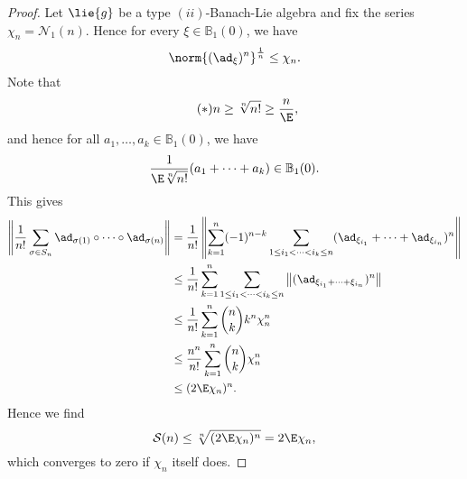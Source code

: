 \documentclass[
11pt,                          %
english                        %
]{article}
\begin{document}
\begin{proof}
	Let $\lie{g}$ be a type $(ii)$-Banach-Lie algebra and fix the series
	$\chi_n = \mathcal{N}_1(n)$. Hence for every $\xi \in \mathbb{B}_1(0)$, we have
	\begin{equation*}
		\norm{(\ad_\xi)^n}^{\frac{1}{n}}
		\leq
		\chi_n.
	\end{equation*}
	Note that 
	\begin{equation*}
		\tag{$*$}
		n \geq \sqrt[n]{n!} \geq \frac{n}{\E},
	\end{equation*}
	and hence for all $a_1, \ldots, a_k \in \mathbb{B}_1(0)$, we have
	\begin{equation*}
		\frac{1}{\E \sqrt[n]{n!}} (a_1 + \cdots + a_k)
		\in \mathbb{B}_1(0).
	\end{equation*}
	This gives
	\begin{align*}
		\left\Vert
			\frac{1}{n!}
			\sum\limits_{\sigma \in S_n}
			\ad_{\sigma(1)}
			\circ \cdots \circ
			\ad_{\sigma(n)}
		\right\Vert
		&=
		\frac{1}{n!}
		\left\Vert
			\sum\limits_{k = 1}^n
			(-1)^{n-k}
			\sum\limits_{1 \leq i_1 < \cdots < i_k \leq n}
			(\ad_{\xi_{i_1}} + \cdots + \ad_{\xi_{i_n}})^n
		\right\Vert
		\\
		& \leq
		\frac{1}{n!}
		\sum\limits_{k = 1}^n
		\sum\limits_{1 \leq i_1 < \cdots < i_k \leq n}
		\left\Vert
			(\ad_{\xi_{i_1} + \cdots + \xi_{i_n}})^n
		\right\Vert
		\\
		& \leq
		\frac{1}{n!}
		\sum\limits_{k = 1}^n
		\binom{n}{k}
		k^n \chi_n^n
		\\
		& \leq
		\frac{n^n}{n!}
		\sum\limits_{k = 1}^n
		\binom{n}{k}
		\chi_n^n
		\\
		& \leq
		(2 \E \chi_n)^n.
	\end{align*}
	Hence we find
	\begin{equation*}
		\mathcal{S}(n)
		\leq
		\sqrt[n]{(2 \E \chi_n)^n}
		=
		2 \E \chi_n,
	\end{equation*}
	which converges to zero if $\chi_n$ itself does.
\end{proof}
\end{document}

